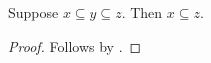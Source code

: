 

\begin{composition}\label{calculation_overlapping_subset}
    Suppose $x\subseteq y\subseteq z$.
    Then $x\subseteq z$.
\end{composition}
\begin{proof} Follows by . \end{proof}
